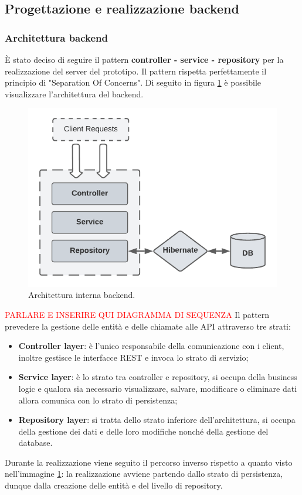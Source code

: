 \subsection{Progettazione e realizzazione backend}
\subsubsection*{Architettura backend}
È stato deciso di seguire il pattern \textbf{controller - service - repository} per la realizzazione del server del prototipo.  Il pattern rispetta perfettamente il principio di "Separation Of Concerns". Di seguito in figura \ref{controller-service-repository} è possibile visualizzare l'architettura del backend.
\FloatBarrier
\begin{figure}[!h]
\centering
\includegraphics[width=0.8\linewidth]{immagini/controllerServiceRepository.pdf}
\caption{Architettura interna backend.}
\label{controller-service-repository}
\end{figure}
\textcolor{red}{PARLARE E INSERIRE QUI DIAGRAMMA DI SEQUENZA}
\FloatBarrier
Il pattern prevedere la gestione delle entità e delle chiamate alle API attraverso tre strati:
\begin{itemize}
  \item \textbf{Controller layer}: è l'unico responsabile della comunicazione con i client, inoltre gestisce le interfacce REST e invoca lo strato di servizio;
  \item \textbf{Service layer}: è lo strato tra controller e repository, si occupa della business logic e qualora sia necessario visualizzare, salvare, modificare o eliminare dati allora comunica con lo strato di persistenza;
  \item \textbf{Repository layer}: si tratta dello strato inferiore dell'architettura, si occupa della gestione dei dati e delle loro modifiche nonché della gestione del database.
\end{itemize}
Durante la realizzazione viene seguito il percorso inverso rispetto a quanto visto nell'immagine \ref{controller-service-repository}: la realizzazione avviene partendo dallo strato di persistenza, dunque dalla creazione delle entità e del livello di repository.
